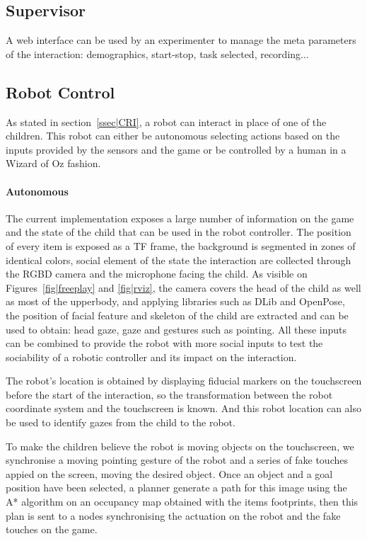 \documentclass[sigconf]{acmart}
\begin{document}
\subsection{Supervisor}
A web interface can be used by an experimenter to manage the meta parameters of
the interaction: demographics, start-stop, task selected, recording...

\subsection{Robot Control}
As stated in section~\ref{ssec|CRI}, a robot can interact in place of one of the
children. This robot can either be autonomous selecting actions based on the
inputs provided by the sensors and the game or be controlled by a human in a
Wizard of Oz fashion.

\paragraph{Autonomous} The current implementation exposes a large number of
information on the game and the state of the child that can be used in the robot
controller. The position of every item is exposed as a TF frame, the background
is segmented in zones of identical colors, social element of the state the
interaction are collected through the RGBD camera and the microphone facing the
child. As visible on Figures~\ref{fig|freeplay} and \ref{fig|rviz}, the camera
covers the head of the child as well as most of the upperbody, and applying
libraries such as DLib and OpenPose, the position of facial feature and skeleton
of the child are extracted and can be used to obtain: head gaze, gaze and
gestures such as pointing. All these inputs can be combined to provide the robot
with more social inputs to test the sociability of a robotic controller and its
impact on the interaction.

The robot's location is obtained by displaying fiducial markers on the
touchscreen before the start of the interaction, so the transformation between
the robot coordinate system and the touchscreen is known. And this robot
location can also be used to identify gazes from the child to the robot. 

To make the children believe the robot is moving objects on the touchscreen, we
synchronise a moving pointing gesture of the robot and a series of fake touches
appied on the screen, moving the desired object. Once an object and a goal
position have been selected, a planner generate a path for this image using the
A\mbox{*} algorithm on an occupancy map obtained with the items footprints, then
this plan is sent to a nodes synchronising the actuation on the robot and the
fake touches on the game.
\end{document}
